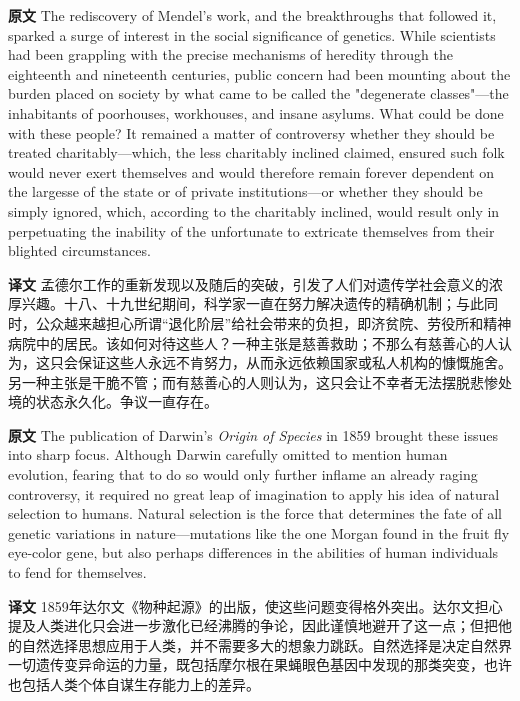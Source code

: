 \documentclass[UTF8,zihao=-4]{ctexart}
\newcommand{\BodyFont}{\fontsize{10.5pt}{15.5pt}\selectfont}
\renewenvironment{quote}{\par\noindent\begingroup\BodyFont}{\par\endgroup}
\begin{document}
\begin{quote}
\noindent\textbf{原文} The rediscovery of Mendel's work, and the breakthroughs that followed it, sparked a surge of interest in the social significance of genetics. While scientists had been grappling with the precise mechanisms of heredity through the eighteenth and nineteenth centuries, public concern had been mounting about the burden placed on society by what came to be called the "degenerate classes"---the inhabitants of poorhouses, workhouses, and insane asylums. What could be done with these people? It remained a matter of controversy whether they should be treated charitably---which, the less charitably inclined claimed, ensured such folk would never exert themselves and would therefore remain forever dependent on the largesse of the state or of private institutions---or whether they should be simply ignored, which, according to the charitably inclined, would result only in perpetuating the inability of the unfortunate to extricate themselves from their blighted circumstances.

\smallskip
\noindent\textbf{译文} 孟德尔工作的重新发现以及随后的突破，引发了人们对遗传学社会意义的浓厚兴趣。十八、十九世纪期间，科学家一直在努力解决遗传的精确机制；与此同时，公众越来越担心所谓“退化阶层”给社会带来的负担，即济贫院、劳役所和精神病院中的居民。该如何对待这些人？一种主张是慈善救助；不那么有慈善心的人认为，这只会保证这些人永远不肯努力，从而永远依赖国家或私人机构的慷慨施舍。另一种主张是干脆不管；而有慈善心的人则认为，这只会让不幸者无法摆脱悲惨处境的状态永久化。争议一直存在。
\end{quote}

\begin{quote}
\noindent\textbf{原文} The publication of Darwin's \emph{Origin of Species} in 1859 brought these issues into sharp focus. Although Darwin carefully omitted to mention human evolution, fearing that to do so would only further inflame an already raging controversy, it required no great leap of imagination to apply his idea of natural selection to humans. Natural selection is the force that determines the fate of all genetic variations in nature---mutations like the one Morgan found in the fruit fly eye-color gene, but also perhaps differences in the abilities of human individuals to fend for themselves.

\smallskip
\noindent\textbf{译文} 1859年达尔文《物种起源》的出版，使这些问题变得格外突出。达尔文担心提及人类进化只会进一步激化已经沸腾的争论，因此谨慎地避开了这一点；但把他的自然选择思想应用于人类，并不需要多大的想象力跳跃。自然选择是决定自然界一切遗传变异命运的力量，既包括摩尔根在果蝇眼色基因中发现的那类突变，也许也包括人类个体自谋生存能力上的差异。
\end{quote}
\end{document}
